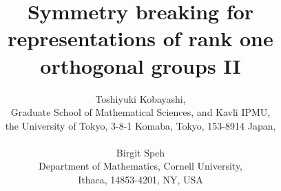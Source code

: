 \documentclass[12pt]{article}
\numberwithin{equation}{section}
\numberwithin{figure}{section}
\theoremstyle{definition}
\theoremstyle{remark}
\theoremstyle{conjecture}
\begin{document}
\title
{Symmetry breaking for representations of rank one orthogonal 
groups II}
\author{Toshiyuki Kobayashi, 
\\
\normalsize{Graduate School of Mathematical Sciences,
 and Kavli IPMU,}
\\
\normalsize{the University of Tokyo, 3-8-1 Komaba, Tokyo, 153-8914 Japan,}
\\
\\
Birgit Speh
\\
\normalsize{Department of Mathematics, Cornell University,} 
\\
\normalsize{Ithaca, 14853-4201, NY, USA}
}
\maketitle%

\newpage
\tableofcontents




















\end{document}
